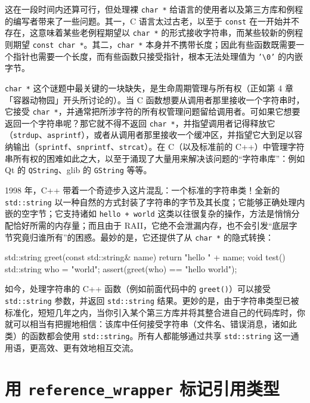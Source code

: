 这在一段时间内还算可行，但处理裸 \texttt{char *} 给语言的使用者以及第三方库和例程的编写者带来了一些问题。其一，C 语言太过古老，以至于 \texttt{const} 在一开始并不存在，这意味着某些老例程期望以 \texttt{char *} 的形式接收字符串，而某些较新的例程则期望 \texttt{const char *}。其二，\texttt{char *} 本身并不携带长度；因此有些函数既需要一个指针也需要一个长度，而有些函数只接受指针，根本无法处理值为 \texttt{'\textbackslash0'} 的内嵌字节。

\texttt{char *} 这个谜题中最关键的一块缺失，是生命周期管理与所有权（正如第 4 章「容器动物园」开头所讨论的）。当 C 函数想要从调用者那里接收一个字符串时，它接受 \texttt{char *}，并通常把所涉字符的所有权管理问题留给调用者。可如果它想要返回一个字符串呢？那它就不得不返回 \texttt{char *}，并指望调用者记得释放它（\texttt{strdup}、\texttt{asprintf}），或者从调用者那里接收一个缓冲区，并指望它大到足以容纳输出（\texttt{sprintf}、\texttt{snprintf}、\texttt{strcat}）。在 C（以及标准前的 C++）中管理字符串所有权的困难如此之大，以至于涌现了大量用来解决该问题的“字符串库”：例如 Qt 的 \texttt{Q\allowbreak{}String}、glib 的 \texttt{G\allowbreak{}String} 等等。

1998 年，C++ 带着一个奇迹步入这片混乱：一个标准的字符串类！全新的 \texttt{std::\allowbreak{}string} 以一种自然的方式封装了字符串的字节及其长度；它能够正确处理内嵌的空字节；它支持诸如 \texttt{hello + world} 这类以往很复杂的操作，方法是悄悄分配恰好所需的内存量；而且由于 RAII，它绝不会泄漏内存，也不会引发“底层字节究竟归谁所有”的困惑。最妙的是，它还提供了从 \texttt{char *} 的隐式转换：

\begin{codebox}[cpp]
    std::string greet(const std::string& name) {
      return "hello " + name;
    }
    void test() {
      std::string who = "world";
      assert(greet(who) == "hello world");
    }
\end{codebox}

如今，处理字符串的 C++ 函数（例如前面代码中的 \texttt{greet(\allowbreak{})\allowbreak{}}）可以接受 \texttt{std::\allowbreak{}string} 参数，并返回 \texttt{std::\allowbreak{}string} 结果。更妙的是，由于字符串类型已被标准化，短短几年之内，当你引入某个第三方库并将其整合进自己的代码库时，你就可以相当有把握地相信：该库中任何接受字符串（文件名、错误消息，诸如此类）的函数都会使用 \texttt{std::\allowbreak{}string}。所有人都能够通过共享 \texttt{std::\allowbreak{}string} 这一通用语，更高效、更有效地相互交流。

\section{用 \texttt{reference\_\allowbreak{}wrapper} 标记引用类型}

